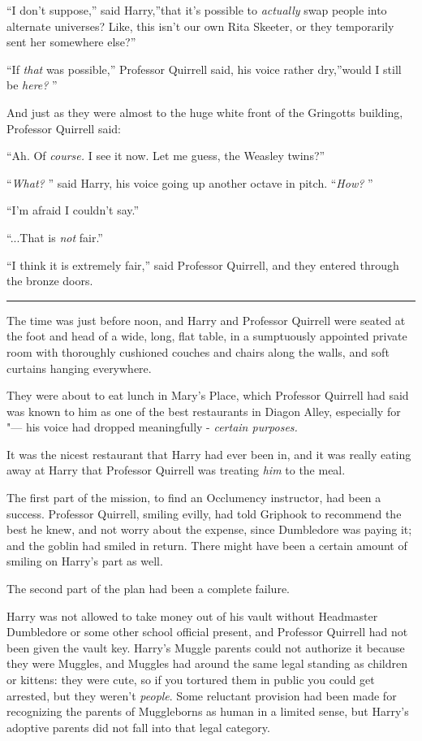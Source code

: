 ``I don't suppose,'' said Harry,''that it's possible to \emph{actually}
swap people into alternate universes? Like, this isn't our own Rita
Skeeter, or they temporarily sent her somewhere else?''

``If \emph{that} was possible,'' Professor Quirrell said, his voice
rather dry,''would I still be \emph{here?} ''

And just as they were almost to the huge white front of the Gringotts
building, Professor Quirrell said:

``Ah. Of \emph{course.} I see it now. Let me guess, the Weasley twins?''

``\emph{What?} '' said Harry, his voice going up another octave in pitch.
``\emph{How?} ''

``I'm afraid I couldn't say.''

``...That is \emph{not} fair.''

``I think it is extremely fair,'' said Professor Quirrell, and they
entered through the bronze doors.

\begin{center}\rule{3in}{0.4pt}\end{center}

The time was just before noon, and Harry and Professor Quirrell were
seated at the foot and head of a wide, long, flat table, in a
sumptuously appointed private room with thoroughly cushioned couches and
chairs along the walls, and soft curtains hanging everywhere.

They were about to eat lunch in Mary's Place, which Professor Quirrell
had said was known to him as one of the best restaurants in Diagon
Alley, especially for "--- his voice had dropped meaningfully -
\emph{certain purposes.}

It was the nicest restaurant that Harry had ever been in, and it was
really eating away at Harry that Professor Quirrell was treating
\emph{him} to the meal.

The first part of the mission, to find an Occlumency instructor, had
been a success. Professor Quirrell, smiling evilly, had told Griphook to
recommend the best he knew, and not worry about the expense, since
Dumbledore was paying it; and the goblin had smiled in return. There
might have been a certain amount of smiling on Harry's part as well.

The second part of the plan had been a complete failure.

Harry was not allowed to take money out of his vault without Headmaster
Dumbledore or some other school official present, and Professor Quirrell
had not been given the vault key. Harry's Muggle parents could not
authorize it because they were Muggles, and Muggles had around the same
legal standing as children or kittens: they were cute, so if you
tortured them in public you could get arrested, but they weren't
\emph{people}. Some reluctant provision had been made for recognizing
the parents of Muggleborns as human in a limited sense, but Harry's
adoptive parents did not fall into that legal category.

